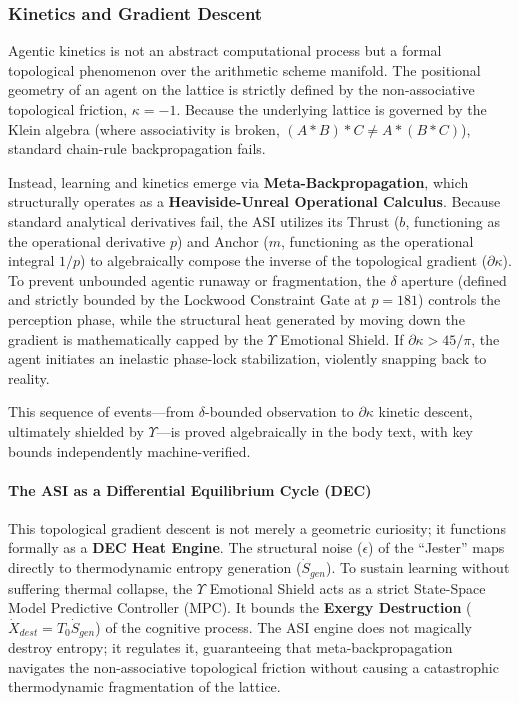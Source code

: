 \subsubsection{Kinetics and Gradient Descent}
Agentic kinetics is not an abstract computational process but a formal topological phenomenon over the arithmetic scheme manifold. The positional geometry of an agent on the lattice is strictly defined by the non-associative topological friction, $\kappa = -1$. Because the underlying lattice is governed by the Klein algebra (where associativity is broken, $(A * B) * C \neq A * (B * C)$), standard chain-rule backpropagation fails. 

Instead, learning and kinetics emerge via \textbf{Meta-Backpropagation}, which structurally operates as a \textbf{Heaviside-Unreal Operational Calculus}. Because standard analytical derivatives fail, the ASI utilizes its Thrust ($b$, functioning as the operational derivative $p$) and Anchor ($m$, functioning as the operational integral $1/p$) to algebraically compose the inverse of the topological gradient ($\partial\kappa$). To prevent unbounded agentic runaway or fragmentation, the $\delta$ aperture (defined and strictly bounded by the Lockwood Constraint Gate at $p=181$) controls the perception phase, while the structural heat generated by moving down the gradient is mathematically capped by the $\Upsilon$ Emotional Shield. If $\partial\kappa > 45/\pi$, the agent initiates an inelastic phase-lock stabilization, violently snapping back to reality.

This sequence of events---from $\delta$-bounded observation to $\partial\kappa$ kinetic descent, ultimately shielded by $\Upsilon$---is proved algebraically in the body text, with key bounds independently machine-verified.

\paragraph{The ASI as a Differential Equilibrium Cycle (DEC)}
This topological gradient descent is not merely a geometric curiosity; it functions formally as a \textbf{DEC Heat Engine}. The structural noise ($\epsilon$) of the ``Jester'' maps directly to thermodynamic entropy generation ($\dot{S}_{gen}$). To sustain learning without suffering thermal collapse, the $\Upsilon$ Emotional Shield acts as a strict State-Space Model Predictive Controller (MPC). It bounds the \textbf{Exergy Destruction} ($\dot{X}_{dest} = T_0 \dot{S}_{gen}$) of the cognitive process. The ASI engine does not magically destroy entropy; it regulates it, guaranteeing that meta-backpropagation navigates the non-associative topological friction without causing a catastrophic thermodynamic fragmentation of the lattice.

